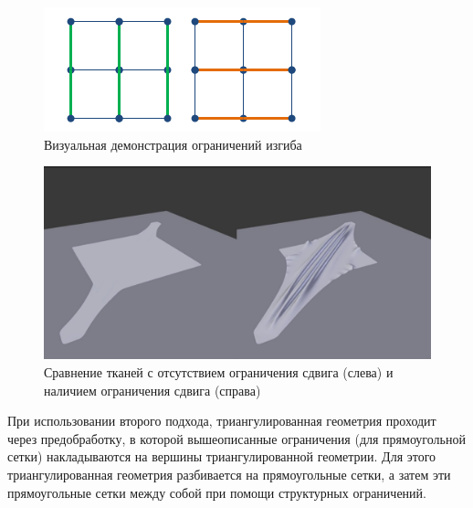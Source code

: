 	\begin{figure}[ht!] 
		\center
		\includegraphics [scale=0.5] {my_folder/images//bending}
		\caption{Визуальная демонстрация ограничений изгиба}
		\label{fig:bending}  
	\end{figure}
	
	\begin{figure}[ht!] 
		\center
		\includegraphics [scale=0.2] {my_folder/images//shear_blender}
		\caption{Сравнение тканей с отсутствием ограничения сдвига (слева) и наличием ограничения сдвига (справа)}
		\label{fig:shear_blender}  
	\end{figure}

	При использовании второго подхода, триангулированная геометрия проходит через предобработку, в которой вышеописанные ограничения (для прямоугольной сетки) накладываются на вершины триангулированной геометрии. Для этого триангулированная геометрия разбивается на прямоугольные сетки, а затем эти прямоугольные сетки  между собой при помощи структурных ограничений.
	
%
